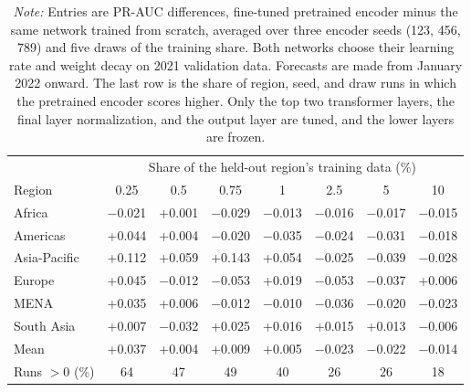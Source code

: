 \documentclass[11pt, letterpaper]{article}
\begin{document}
\begin{table}[!htbp]
\centering
\caption{Fine-Tuned Pretrained Encoder Versus the Same Network Trained From Scratch, Top Two Layers Tuned}
\label{tab:finetune_grid}
\small
\begin{tabular}{lccccccc}
\hline
 & \multicolumn{7}{c}{Share of the held-out region's training data (\%)} \\
Region & 0.25 & 0.5 & 0.75 & 1 & 2.5 & 5 & 10 \\
\hline
Africa & $-$0.021 & +0.001 & $-$0.029 & $-$0.013 & $-$0.016 & $-$0.017 & $-$0.015 \\
Americas & +0.044 & +0.004 & $-$0.020 & $-$0.035 & $-$0.024 & $-$0.031 & $-$0.018 \\
Asia-Pacific & +0.112 & +0.059 & +0.143 & +0.054 & $-$0.025 & $-$0.039 & $-$0.028 \\
Europe & +0.045 & $-$0.012 & $-$0.053 & +0.019 & $-$0.053 & $-$0.037 & +0.006 \\
MENA & +0.035 & +0.006 & $-$0.012 & $-$0.010 & $-$0.036 & $-$0.020 & $-$0.023 \\
South Asia & +0.007 & $-$0.032 & +0.025 & +0.016 & +0.015 & +0.013 & $-$0.006 \\
\hline
Mean & +0.037 & +0.004 & +0.009 & +0.005 & $-$0.023 & $-$0.022 & $-$0.014 \\
Runs $>0$ (\%) & 64 & 47 & 49 & 40 & 26 & 26 & 18 \\
\hline
\end{tabular}
\caption*{\footnotesize \textit{Note:} Entries are PR-AUC differences, fine-tuned pretrained encoder minus the same network trained from scratch, averaged over three encoder seeds (123, 456, 789) and five draws of the training share. Both networks choose their learning rate and weight decay on 2021 validation data. Forecasts are made from January 2022 onward. The last row is the share of region, seed, and draw runs in which the pretrained encoder scores higher. Only the top two transformer layers, the final layer normalization, and the output layer are tuned, and the lower layers are frozen.}
\end{table}
\end{document}
